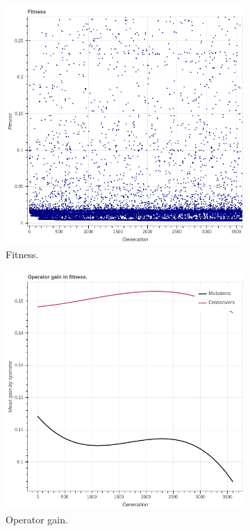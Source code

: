  \begin{figure}
    \begin{subfigure}{0.5\textwidth}
        \includegraphics[width=0.8\linewidth]{figures/incrementalfitness30d.png}
        \caption{Fitness.}
    \end{subfigure}
    \begin{subfigure}{0.5\textwidth}
        \includegraphics[width=0.8\linewidth]{figures/incrementaloperatorgain30d.png}
        \caption{Operator gain.}
    \end{subfigure}
        \begin{subfigure}{0.5\textwidth}

\end{subfigure}
\end{figure}
